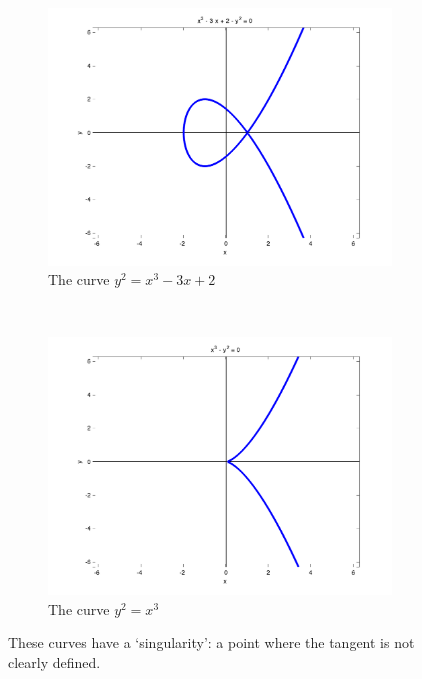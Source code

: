 \documentclass{article}
\begin{document}
\begin{figure}[h]
\centering

\begin{subfigure}{.5\textwidth}
	\centering
	\includegraphics[width=1\linewidth]{images/ec2.png}
	\caption{The curve $y^2 = x^3 - 3x + 2$}
\end{subfigure}%
~%
\begin{subfigure}{.5\textwidth}
	\centering
	\includegraphics[width=1\linewidth]{images/ec3.png}
	\caption{The curve $y^2 = x^3$}
\end{subfigure}

\caption{These curves have a `singularity': a point where the tangent is not clearly defined.}
\label{fig:ec-singular}
\end{figure}
\end{document}
